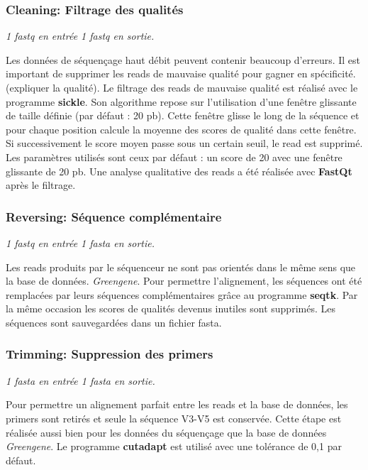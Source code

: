 \documentclass[12pt,a4paper]{article}
\begin{document}
\subsubsection{Cleaning: Filtrage des qualités}
\noindent\emph{1 fastq en entrée 1 fastq en sortie. }

Les données de séquençage haut débit peuvent contenir beaucoup d'erreurs. Il est important de supprimer les reads de mauvaise qualité pour gagner en spécificité. (expliquer la qualité).
Le filtrage des reads de mauvaise qualité est réalisé avec le programme \textbf{sickle}\cite{JoshiNA2011}. Son algorithme repose sur l'utilisation d'une fenêtre glissante de taille définie (par défaut : 20 pb). Cette fenêtre glisse le long de la séquence et pour chaque position calcule la moyenne des scores de qualité dans cette fenêtre. Si successivement le score moyen passe sous un certain seuil, le read est supprimé. Les paramètres utilisés sont ceux par défaut : un score de 20 avec une fenêtre glissante de 20 pb.
Une analyse qualitative des reads a été réalisée avec \textbf{FastQt}\cite{Labsquareteam2017} après le filtrage.


\subsubsection{Reversing: Séquence complémentaire}
\noindent\emph{1 fastq en entrée 1 fasta en sortie. }

Les reads produits par le séquenceur ne sont pas orientés dans le même sens que la base de données. \textit{Greengene}\cite{DeSantis2006}. Pour permettre l'alignement, les séquences ont été remplacées par leurs séquences complémentaires grâce au programme \textbf{seqtk}\cite{H.Li}.
Par la même occasion les scores de qualités devenus inutiles sont supprimés. Les séquences sont sauvegardées dans un fichier fasta.

\subsubsection{Trimming: Suppression des primers}
\noindent\emph{1 fasta en entrée 1 fasta en sortie.}

Pour permettre un alignement parfait entre les reads et la base de données, les primers sont retirés et seule la séquence V3-V5 est conservée. Cette étape est réalisée aussi bien pour les données du séquençage que la base de données \textit{Greengene}.
Le programme \textbf{cutadapt}\cite{Martin2011} est utilisé avec une tolérance de 0,1 par défaut.
\end{document}
